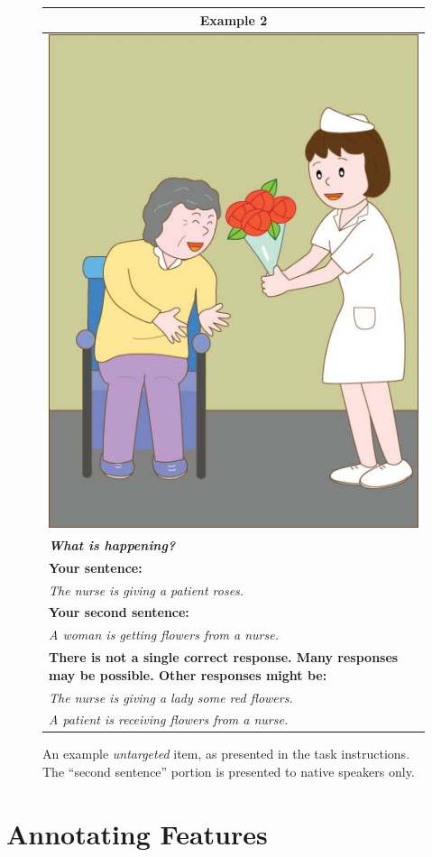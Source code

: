 \documentclass[12pt]{article}
\begin{document}
\begin{figure}[!htb]
\begin{center}
\begin{tabular}{|p{}|}
\hline
\multicolumn{1}{|c|}{\textbf{Example 2}}\\
\hline
\multicolumn{1}{|c|}{\includegraphics[width=0.4\columnwidth,trim=0 0 0 -3]{figures/ex01.jpg}}\\
\hline
\textbf{\textit{What is happening?}}\\
\hline
\textbf{Your sentence:} \\
\textit{The nurse is giving a patient roses.}\\
\hline
\textbf{Your second sentence:} \\
\textit{A woman is getting flowers from a nurse.} \\
\hline
\textbf{There is not a single correct response. Many responses may be possible. Other responses might be:} \\
\textit{The nurse is giving a lady some red flowers.} \\
\textit{A patient is receiving flowers from a nurse.} \\
\hline
\end{tabular}
\end{center}
\caption{An example \textit{untargeted} item, as presented in the task instructions. The ``second sentence'' portion is presented to native speakers only.}
\label{fig:instructions2}
\end{figure}

\clearpage
\section{Annotating Features}

\end{document}
